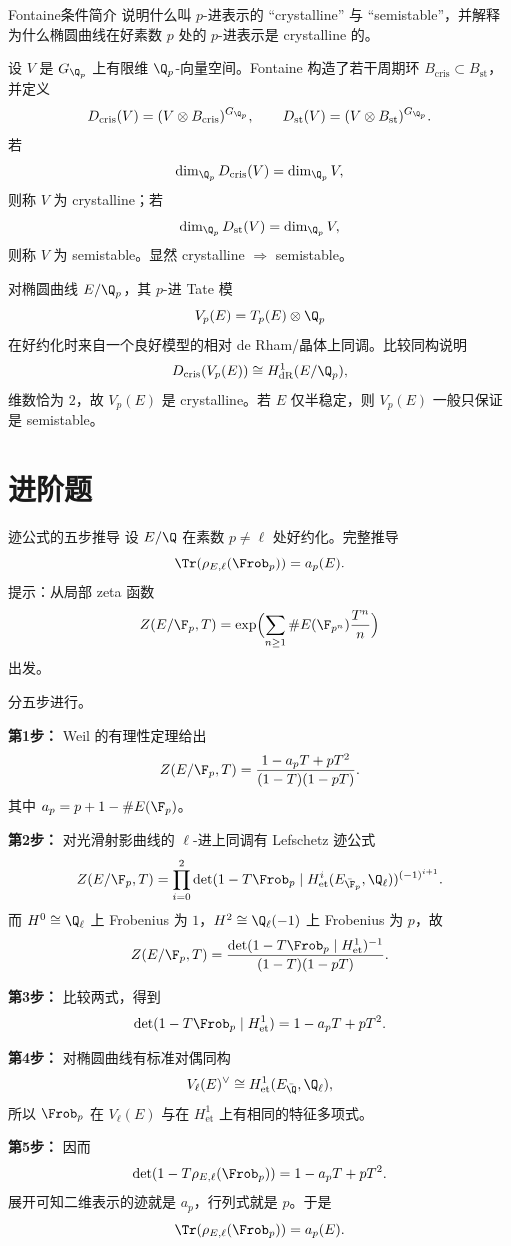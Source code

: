 \begin{problem}{Fontaine条件简介}
说明什么叫 $p$-进表示的 ``crystalline'' 与 ``semistable''，并解释为什么椭圆曲线在好素数 $p$ 处的 $p$-进表示是 crystalline 的。
\end{problem}
\begin{solution}
设 $V$ 是 $G_{\Q_p}$ 上有限维 $\Q_p$-向量空间。Fontaine 构造了若干周期环 $B_{\mathrm{cris}}\subset B_{\mathrm{st}}$，并定义
\[
D_{\mathrm{cris}}(V)=(V\otimes B_{\mathrm{cris}})^{G_{\Q_p}},
\qquad
D_{\mathrm{st}}(V)=(V\otimes B_{\mathrm{st}})^{G_{\Q_p}}.
\]
若
\[
\dim_{\Q_p}D_{\mathrm{cris}}(V)=\dim_{\Q_p}V,
\]
则称 $V$ 为 crystalline；若
\[
\dim_{\Q_p}D_{\mathrm{st}}(V)=\dim_{\Q_p}V,
\]
则称 $V$ 为 semistable。显然 crystalline $\Rightarrow$ semistable。

对椭圆曲线 $E/\Q_p$，其 $p$-进 Tate 模
\[
V_p(E)=T_p(E)\otimes \Q_p
\]
在好约化时来自一个良好模型的相对 de Rham/晶体上同调。比较同构说明
\[
D_{\mathrm{cris}}(V_p(E))\cong H^1_{\mathrm{dR}}(E/\Q_p),
\]
维数恰为 $2$，故 $V_p(E)$ 是 crystalline。若 $E$ 仅半稳定，则 $V_p(E)$ 一般只保证是 semistable。
\end{solution}

\section{进阶题 \medium}

\begin{problem}{迹公式的五步推导}
设 $E/\Q$ 在素数 $p\neq \ell$ 处好约化。完整推导
\[
\Tr(\rho_{E,\ell}(\Frob_p))=a_p(E).
\]
提示：从局部 zeta 函数
\[
Z(E/\F_p,T)=\exp\Bigl(\sum_{n\ge1}\#E(\F_{p^n})\frac{T^n}{n}\Bigr)
\]
出发。
\end{problem}
\begin{solution}
分五步进行。

\textbf{第1步：} Weil 的有理性定理给出
\[
Z(E/\F_p,T)=\frac{1-a_pT+pT^2}{(1-T)(1-pT)}.
\]
其中 $a_p=p+1-\#E(\F_p)$。

\textbf{第2步：} 对光滑射影曲线的 $\ell$-进上同调有 Lefschetz 迹公式
\[
Z(E/\F_p,T)=\prod_{i=0}^2 \det(1-T\Frob_p\mid H^i_{\mathrm{et}}(E_{\bar\F_p},\Q_\ell))^{(-1)^{i+1}}.
\]
而 $H^0\cong \Q_\ell$ 上 Frobenius 为 $1$，$H^2\cong \Q_\ell(-1)$ 上 Frobenius 为 $p$，故
\[
Z(E/\F_p,T)=\frac{\det(1-T\Frob_p\mid H^1_{\mathrm{et}})^{-1}}{(1-T)(1-pT)}.
\]

\textbf{第3步：} 比较两式，得到
\[
\det(1-T\Frob_p\mid H^1_{\mathrm{et}})=1-a_pT+pT^2.
\]

\textbf{第4步：} 对椭圆曲线有标准对偶同构
\[
V_\ell(E)^\vee\cong H^1_{\mathrm{et}}(E_{\bar\Q},\Q_\ell),
\]
所以 $\Frob_p$ 在 $V_\ell(E)$ 与在 $H^1_{\mathrm{et}}$ 上有相同的特征多项式。

\textbf{第5步：} 因而
\[
\det(1-T\rho_{E,\ell}(\Frob_p))=1-a_pT+pT^2.
\]
展开可知二维表示的迹就是 $a_p$，行列式就是 $p$。于是
\[
\Tr(\rho_{E,\ell}(\Frob_p))=a_p(E).
\]
\end{solution}

